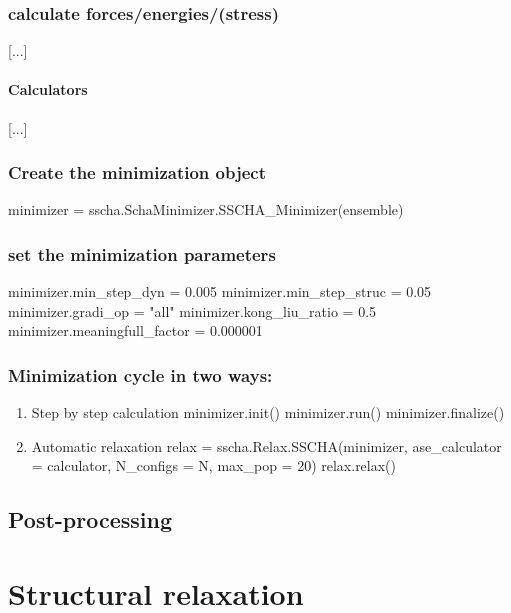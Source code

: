 \documentclass[]{report}
\begin{document}
\subsection{calculate forces/energies/(stress)}
[...]
\subsubsection{Calculators}
[...]
\subsection{Create the minimization object}
minimizer = sscha.SchaMinimizer.SSCHA\_Minimizer(ensemble)
\subsection{set the minimization parameters}
minimizer.min\_step\_dyn = 0.005
minimizer.min\_step\_struc = 0.05
minimizer.gradi\_op = "all"
minimizer.kong\_liu\_ratio = 0.5
minimizer.meaningfull\_factor = 0.000001

\subsection{Minimization cycle in two ways:}
\begin{enumerate}
	\item Step by step calculation
	minimizer.init()
	minimizer.run()
	minimizer.finalize()
	\item Automatic relaxation
	relax = sscha.Relax.SSCHA(minimizer, ase\_calculator = calculator, N\_configs = N, max\_pop = 20)
	relax.relax()
\end{enumerate}

\section{Post-processing}
\chapter{Structural relaxation}
\end{document}

